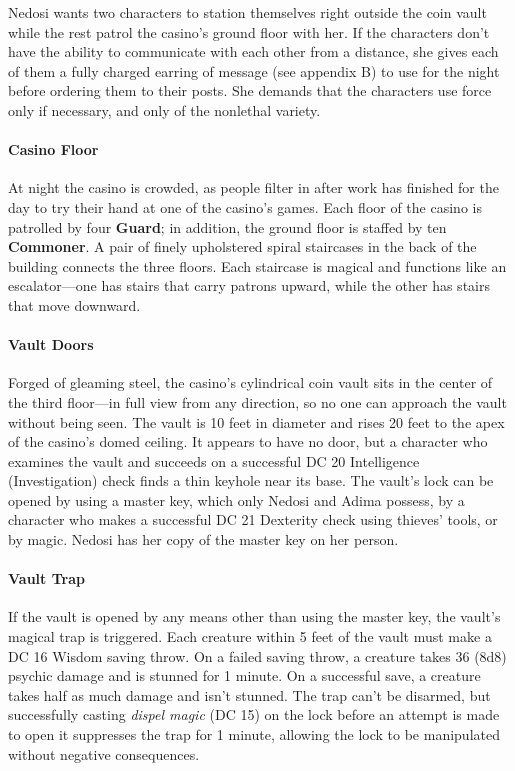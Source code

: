 \documentclass[10pt,a4,twoside,twocolumn,openany,nodeprecatedcode]{dndbook}
\begin{document}
Nedosi wants two characters to station themselves right outside the coin vault while the rest patrol the casino's ground floor with her. If the characters don't have the ability to communicate with each other from a distance, she gives each of them a fully charged earring of message (see appendix B) to use for the night before ordering them to their posts. She demands that the characters use force only if necessary, and only of the nonlethal variety.
\paragraph{Casino Floor}
At night the casino is crowded, as people filter in after work has finished for the day to try their hand at one of the casino's games. Each floor of the casino is patrolled by four \textbf{Guard}; in addition, the ground floor is staffed by ten \textbf{Commoner}. A pair of finely upholstered spiral staircases in the back of the building connects the three floors. Each staircase is magical and functions like an escalator—one has stairs that carry patrons upward, while the other has stairs that move downward.
\paragraph{Vault Doors}
Forged of gleaming steel, the casino's cylindrical coin vault sits in the center of the third floor—in full view from any direction, so no one can approach the vault without being seen.
The vault is 10 feet in diameter and rises 20 feet to the apex of the casino's domed ceiling. It appears to have no door, but a character who examines the vault and succeeds on a successful DC 20 Intelligence (Investigation) check finds a thin keyhole near its base. The vault's lock can be opened by using a master key, which only Nedosi and Adima possess, by a character who makes a successful DC 21 Dexterity check using thieves' tools, or by magic. Nedosi has her copy of the master key on her person.
\paragraph{Vault Trap}
If the vault is opened by any means other than using the master key, the vault's magical trap is triggered. Each creature within 5 feet of the vault must make a DC 16 Wisdom saving throw. On a failed saving throw, a creature takes 36 (8d8) psychic damage and is stunned for 1 minute. On a successful save, a creature takes half as much damage and isn't stunned.
The trap can't be disarmed, but successfully casting \textit{dispel magic} (DC 15) on the lock before an attempt is made to open it suppresses the trap for 1 minute, allowing the lock to be manipulated without negative consequences.
\end{document}
